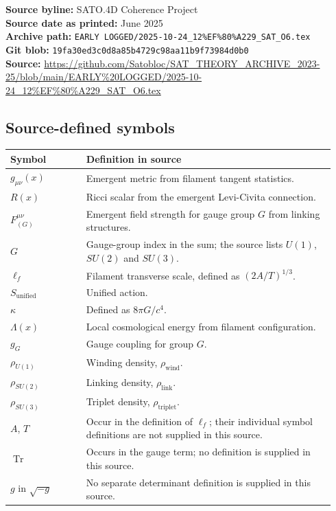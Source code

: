 \documentclass[11pt]{article}
\begin{document}
\textbf{Source byline:} SATO.4D Coherence Project\\
\textbf{Source date as printed:} June 2025\\
\textbf{Archive path:} \texttt{EARLY LOGGED/2025-10-24\_12\%EF\%80\%A229\_SAT\_O6.tex}\\
\textbf{Git blob:} \texttt{19fa30ed3c0d8a85b4729c98aa11b9f73984d0b0}\\
\textbf{Source:} \url{https://github.com/Satobloc/SAT_THEORY_ARCHIVE_2023-25/blob/main/EARLY%20LOGGED/2025-10-24_12%EF%80%A229_SAT_O6.tex}

\subsection*{Source-defined symbols}
\begin{longtable}{L{0.22\linewidth}L{0.72\linewidth}}
\toprule
\textbf{Symbol} & \textbf{Definition in source}\\
\midrule
\endhead
$g_{\mu\nu}(x)$ & Emergent metric from filament tangent statistics.\\
$R(x)$ & Ricci scalar from the emergent Levi-Civita connection.\\
$F^{\mu\nu}_{(G)}$ & Emergent field strength for gauge group $G$ from linking structures.\\
$G$ & Gauge-group index in the sum; the source lists $U(1)$, $SU(2)$ and $SU(3)$.\\
$\ell_f$ & Filament transverse scale, defined as $(2A/T)^{1/3}$.\\
$S_{\mathrm{unified}}$ & Unified action.\\
$\kappa$ & Defined as $8\pi G/c^4$.\\
$\Lambda(x)$ & Local cosmological energy from filament configuration.\\
$g_G$ & Gauge coupling for group $G$.\\
$\rho_{U(1)}$ & Winding density, $\rho_{\mathrm{wind}}$.\\
$\rho_{SU(2)}$ & Linking density, $\rho_{\mathrm{link}}$.\\
$\rho_{SU(3)}$ & Triplet density, $\rho_{\mathrm{triplet}}$.\\
$A$, $T$ & Occur in the definition of $\ell_f$; their individual symbol definitions are not supplied in this source.\\
$\operatorname{Tr}$ & Occurs in the gauge term; no definition is supplied in this source.\\
$g$ in $\sqrt{-g}$ & No separate determinant definition is supplied in this source.\\
\bottomrule
\end{longtable}
\end{document}
